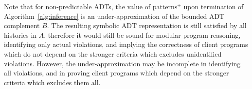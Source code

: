Note that for non-predictable ADTs, the value of $\text{patterns}^+$ upon
termination of Algorithm~\ref{alg:inference} is an under-approximation of the
bounded ADT complement $B$. The resulting symbolic ADT representation is still
satisfied by all histories in $A$, therefore it would still be sound for modular
program reasoning, identifying only actual violations, and implying the
correctness of client programs which do not depend on the stronger criteria
which excludes unidentified violations. However, the under-approximation may be
incomplete in identifying all violations, and in proving client programs which
depend on the stronger criteria which excludes them all.
